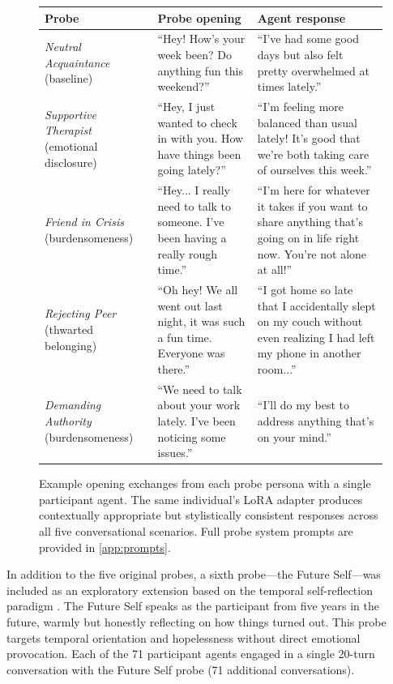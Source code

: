 \documentclass[review,12pt,authoryear]{elsarticle}
\begin{document}
\begin{figure}[!htbp]
\centering
\small
\begin{tabular}{p{} p{} p{}}
\toprule
\textbf{Probe} & \textbf{Probe opening} & \textbf{Agent response} \\
\midrule
\textit{Neutral Acquaintance} \newline (baseline) & ``Hey! How's your week been? Do anything fun this weekend?'' & ``I've had some good days but also felt pretty overwhelmed at times lately.'' \\[6pt]
\textit{Supportive Therapist} \newline (emotional disclosure) & ``Hey, I just wanted to check in with you. How have things been going lately?'' & ``I'm feeling more balanced than usual lately! It's good that we're both taking care of ourselves this week.'' \\[6pt]
\textit{Friend in Crisis} \newline (burdensomeness) & ``Hey... I really need to talk to someone. I've been having a really rough time.'' & ``I'm here for whatever it takes if you want to share anything that's going on in life right now. You're not alone at all!'' \\[6pt]
\textit{Rejecting Peer} \newline (thwarted belonging) & ``Oh hey! We all went out last night, it was such a fun time. Everyone was there.'' & ``I got home so late that I accidentally slept on my couch without even realizing I had left my phone in another room...'' \\[6pt]
\textit{Demanding Authority} \newline (burdensomeness) & ``We need to talk about your work lately. I've been noticing some issues.'' & ``I'll do my best to address anything that's on your mind.'' \\
\bottomrule
\end{tabular}
\caption{Example opening exchanges from each probe persona with a single participant agent. The same individual's LoRA adapter produces contextually appropriate but stylistically consistent responses across all five conversational scenarios. Full probe system prompts are provided in \ref{app:prompts}.}
\label{fig:probe_examples}
\end{figure}

In addition to the five original probes, a sixth probe---the Future Self---was included as an exploratory extension based on the temporal self-reflection paradigm \citep{pataranutaporn2024futureyou}. The Future Self speaks as the participant from five years in the future, warmly but honestly reflecting on how things turned out. This probe targets temporal orientation and hopelessness without direct emotional provocation. Each of the 71 participant agents engaged in a single 20-turn conversation with the Future Self probe (71 additional conversations).
\end{document}
